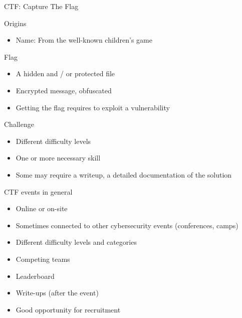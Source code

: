 \documentclass[12 pt]{beamer}
\begin{document}

\begin{frame}{CTF: Capture The Flag}

  \begin{block}{Origins}
    \begin{itemize}
      \item{Name: From the well-known children's game}
    \end{itemize}
  \end{block}

  \begin{block}{Flag}
    \begin{itemize}
        \item{A hidden and / or protected file}
        \item{Encrypted message, obfuscated}
        \item{Getting the flag requires to exploit a vulnerability}
    \end{itemize}
  \end{block}
  
  \begin{block}{Challenge}
    \begin{itemize}
        \item{Different difficulty levels}
        \item{One or more necessary skill}
        \item{Some may require a writeup, a detailed documentation of the solution}
    \end{itemize}
  \end{block}
  

\end{frame}


\begin{frame}{CTF events in general}

  \begin{itemize}
    \item{Online or on-site}
    \item{Sometimes connected to other cybersecurity events (conferences, camps)}
    \item{Different difficulty levels and categories}
    \item{Competing teams}
    \item{Leaderboard}
  \end{itemize}
  
  \begin{exampleblock}{}
  \begin{itemize}
    \item{Write-ups (after the event)}
    \item{Good opportunity for recruitment}
  \end{itemize}
  \end{exampleblock}

\end{frame}
\end{document}
